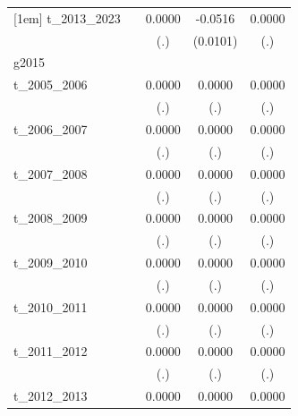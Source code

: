 \begin{table}[htbp]
\begin{tabular}{l*{4}{c}}
[1em]
t\_2013\_2023 &                     &      0.0000         &     -0.0516\sym{***}&      0.0000         \\
            &                     &         (.)         &    (0.0101)         &         (.)         \\
\hline
g2015       &                     &                     &                     &                     \\
t\_2005\_2006 &                     &      0.0000         &      0.0000         &      0.0000         \\
            &                     &         (.)         &         (.)         &         (.)         \\
[1em]
t\_2006\_2007 &                     &      0.0000         &      0.0000         &      0.0000         \\
            &                     &         (.)         &         (.)         &         (.)         \\
[1em]
t\_2007\_2008 &                     &      0.0000         &      0.0000         &      0.0000         \\
            &                     &         (.)         &         (.)         &         (.)         \\
[1em]
t\_2008\_2009 &                     &      0.0000         &      0.0000         &      0.0000         \\
            &                     &         (.)         &         (.)         &         (.)         \\
[1em]
t\_2009\_2010 &                     &      0.0000         &      0.0000         &      0.0000         \\
            &                     &         (.)         &         (.)         &         (.)         \\
[1em]
t\_2010\_2011 &                     &      0.0000         &      0.0000         &      0.0000         \\
            &                     &         (.)         &         (.)         &         (.)         \\
[1em]
t\_2011\_2012 &                     &      0.0000         &      0.0000         &      0.0000         \\
            &                     &         (.)         &         (.)         &         (.)         \\
[1em]
t\_2012\_2013 &                     &      0.0000         &      0.0000         &      0.0000         \\

\end{tabular}
\end{table}
